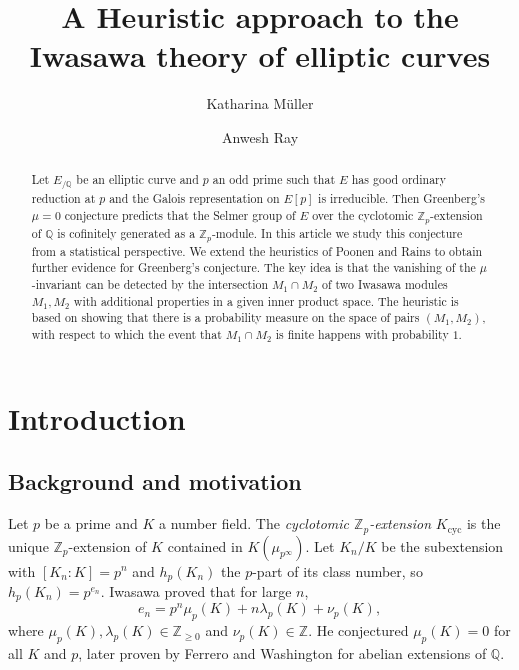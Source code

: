 \documentclass[12pt]{amsart}
\newcommand{\Q}{\mathbb{Q}}
\numberwithin{equation}{section}
\begin{document}
\title[]{A Heuristic approach to the Iwasawa theory of elliptic curves}
\author[K.~M\"uller]{Katharina M\"uller}
\address[Müller]{Institut für Theoretische Informatik, Mathematik und Operations Research, Universität der Bundeswehr München, Werner-Heisenberg-Weg 39, 85577 Neubiberg, Germany}


\author[A.~Ray]{Anwesh Ray}
\address[Ray]{Chennai Mathematical Institute, H1, SIPCOT IT Park, Kelambakkam, Siruseri, Tamil Nadu 603103, India}



\keywords{}
\subjclass[2020]{}

\maketitle

\begin{abstract}
Let $E_{/\mathbb{Q}}$ be an elliptic curve and $p$ an odd prime such that $E$ has good ordinary reduction at $p$ and the Galois representation on $E[p]$ is irreducible. Then Greenberg's $\mu=0$ conjecture predicts that the Selmer group of $E$ over the cyclotomic $\mathbb{Z}_p$-extension of $\Q$ is cofinitely generated as a $\mathbb{Z}_p$-module. In this article we study this conjecture from a statistical perspective. We extend the heuristics of Poonen and Rains to obtain further evidence for Greenberg's conjecture. The key idea is that the vanishing of the $\mu$-invariant can be detected by the intersection $M_1\cap M_2$ of two Iwasawa modules $M_1, M_2$ with additional properties in a given inner product space. The heuristic is based on showing that there is a probability measure on the space of pairs $(M_1, M_2)$, with respect to which the event that $M_1\cap M_2$ is finite happens with probability $1$.
\end{abstract}

\section{Introduction}
\subsection{Background and motivation} Let \( p \) be a prime and \( K \) a number field. The \emph{cyclotomic \( \mathbb{Z}_p \)-extension} \( K_{\operatorname{cyc}} \) is the unique \( \mathbb{Z}_p \)-extension of \( K \) contained in \( K(\mu_{p^\infty}) \). Let \( K_n/K \) be the subextension with \( [K_n:K] = p^n \) and \( h_p(K_n) \) the \( p \)-part of its class number, so \( h_p(K_n) = p^{e_n} \). Iwasawa proved that for large \( n \),  
\[
e_n = p^n \mu_p(K) + n \lambda_p(K) + \nu_p(K),
\]
where \( \mu_p(K), \lambda_p(K) \in \mathbb{Z}_{\geq 0} \) and \( \nu_p(K) \in \mathbb{Z} \). He conjectured \( \mu_p(K) = 0 \) for all \( K \) and \( p \), later proven by Ferrero and Washington for abelian extensions of \( \mathbb{Q} \).
\end{document}
